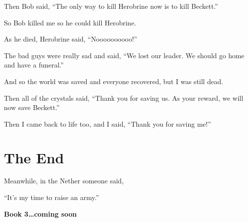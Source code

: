\documentclass[12pt,oneside]{krantz}
\begin{document}
Then Bob said, ``The only way to kill Herobrine now is to kill
Beckett.''

So Bob killed me so he could kill Herobrine.

As he died, Herobrine said, ``Noooooooooo!''

The bad guys were really sad and said, ``We lost our leader. We should
go home and have a funeral.''

And so the world was saved and everyone recovered, but I was still dead.

Then all of the crystals said, ``Thank you for saving us. As your
reward, we will now save Beckett.''

Then I came back to life too, and I said, ``Thank you for saving me!''

\hypertarget{the-end}{%
\chapter*{The End}\label{the-end}}


Meanwhile, in the Nether someone said,

``It's my time to raise an army.''

\textbf{Book 3\ldots{}coming soon}
\end{document}
